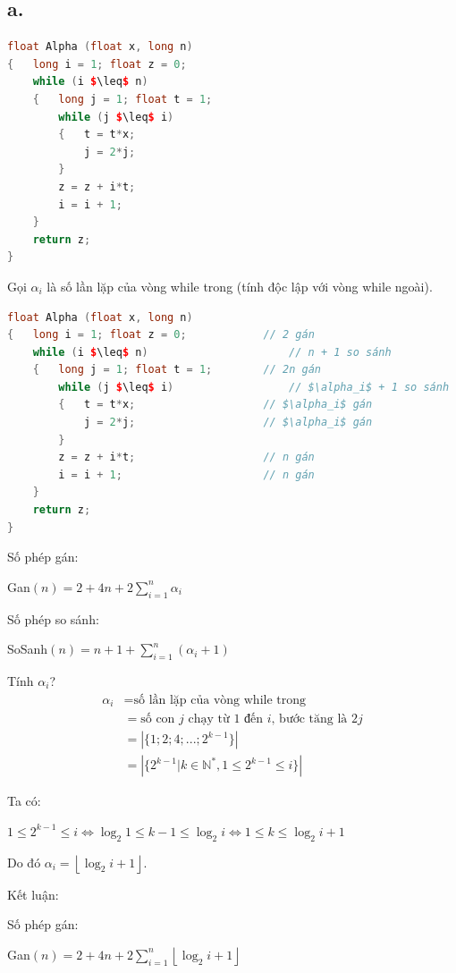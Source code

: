 \documentclass[12pt, a4paper, fleqn]{article}
\begin{document}
	\subsection*{a.}
	
	\begin{lstlisting}[language = C++, mathescape]
float Alpha (float x, long n)
{	long i = 1; float z = 0;
	while (i $\leq$ n)
	{	long j = 1; float t = 1;
		while (j $\leq$ i)
		{	t = t*x;
			j = 2*j;
		}
		z = z + i*t;
		i = i + 1;
	}
	return z;
}
	\end{lstlisting}
	
	Gọi $\alpha_i$ là số lần lặp của vòng while trong (tính độc lập với vòng while ngoài).
	
	\begin{lstlisting}[language = C++, mathescape, texcl]
float Alpha (float x, long n)
{	long i = 1; float z = 0;			// 2 gán
	while (i $\leq$ n)						// n + 1 so sánh
	{	long j = 1; float t = 1;		// 2n gán
		while (j $\leq$ i)					// $\alpha_i$ + 1 so sánh
		{	t = t*x;					// $\alpha_i$ gán
			j = 2*j;					// $\alpha_i$ gán
		}
		z = z + i*t;					// n gán
		i = i + 1;						// n gán
	}
	return z;
}
	\end{lstlisting}
	
	Số phép gán:
	
	Gan$\displaystyle (n) = 2 + 4n + 2 \sum_{i = 1}^n \alpha_i$
	
	Số phép so sánh:
	
	SoSanh$\displaystyle (n) = n + 1 + \sum_{i = 1}^n (\alpha_i + 1)$
	
	Tính $\alpha_i$?
	\begin{align*}
		\alpha_i &= \text{số lần lặp của vòng while trong} \\
		         &= \text{số con $j$ chạy từ 1 đến $i$, bước tăng là $2j$} \\
		         &= \left| \{ 1; 2; 4; ...; 2^{k - 1} \} \right| \\
		         &= \left| \{ 2^{k - 1} | k \in \mathbb{N^*}, 1 \leq 2^{k - 1} \leq i\} \right| 
	\end{align*}
	
	Ta có:
	
	$1 \leq 2^{k - 1} \leq i \Leftrightarrow \log_2 1 \leq k - 1 \leq \log_2 i \Leftrightarrow 1 \leq k \leq \log_2 i + 1$
	
	Do đó $\alpha_i = \left\lfloor \log_2 i + 1 \right\rfloor$.
	
	Kết luận:
	
	Số phép gán:
	
	Gan$\displaystyle (n) = 2 + 4n + 2 \sum_{i = 1}^n \left\lfloor \log_2 i + 1 \right\rfloor$
	
\end{document}
